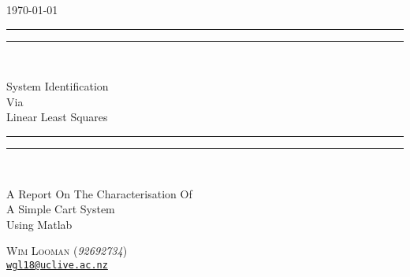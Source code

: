 \begin{titlepage}
\centering
\vspace*{\baselineskip}

\flushright\today\\
\centering
\rule{\textwidth}{1.6pt}\vspace*{-\baselineskip}\vspace*{2pt}
\rule{\textwidth}{0.4pt}\\[\baselineskip]

{\Huge \scshape

  System Identification\\
  Via\\
  Linear Least Squares

}

\rule{\textwidth}{0.4pt}\vspace*{-\baselineskip}\vspace*{3.2pt}
\rule{\textwidth}{1.6pt}\\[\baselineskip]
{\scshape \large

  A Report On The Characterisation Of\\
  A Simple Cart System\\
  Using Matlab

}


\vspace*{3\baselineskip}
{\Large

  {\scshape Wim Looman} (\emph{92692734})\\
  \href{mailto:wgl18@uclive.ac.nz}{\texttt{wgl18@uclive.ac.nz}}\\
}

\end{titlepage}
